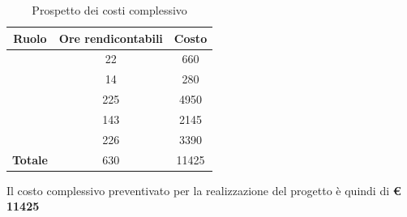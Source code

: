 \begin{table}[H]
	\begin{center}
		\begin{tabular}{|c|c|c|}
			\hline
			\textbf{Ruolo}	& \textbf{Ore rendicontabili} & \textbf{Costo} \\
			\hline
			\Res	&	22  &	660	\\
			\hline
			\Amm	&	14  &	280	\\
			\hline
			\Prog	&	225  &	4950	\\
			\hline
			\Progr	&	143  &	2145	\\
			\hline
			\Ver	&	226  &	3390	\\
			\hline
			\textbf{Totale}  &	630  &	11425	\\
			\hline
		\end{tabular}
	\end{center}
	\caption{Prospetto dei costi complessivo}
\end{table}

Il costo complessivo preventivato per la realizzazione del progetto è quindi di \textbf{€ 11425}